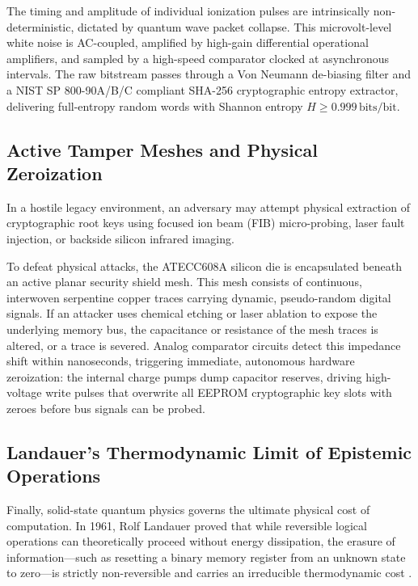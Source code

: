 The timing and amplitude of individual ionization pulses are intrinsically non-deterministic, dictated by quantum wave packet collapse. This microvolt-level white noise is AC-coupled, amplified by high-gain differential operational amplifiers, and sampled by a high-speed comparator clocked at asynchronous intervals. The raw bitstream passes through a Von Neumann de-biasing filter and a NIST SP 800-90A/B/C compliant SHA-256 cryptographic entropy extractor, delivering full-entropy random words with Shannon entropy $H \ge 0.999\,\mathrm{bits/bit}$.

\subsection{Active Tamper Meshes and Physical Zeroization}

In a hostile legacy environment, an adversary may attempt physical extraction of cryptographic root keys using focused ion beam (FIB) micro-probing, laser fault injection, or backside silicon infrared imaging. 

To defeat physical attacks, the ATECC608A silicon die is encapsulated beneath an active planar security shield mesh. This mesh consists of continuous, interwoven serpentine copper traces carrying dynamic, pseudo-random digital signals. If an attacker uses chemical etching or laser ablation to expose the underlying memory bus, the capacitance or resistance of the mesh traces is altered, or a trace is severed. Analog comparator circuits detect this impedance shift within nanoseconds, triggering immediate, autonomous hardware zeroization: the internal charge pumps dump capacitor reserves, driving high-voltage write pulses that overwrite all EEPROM cryptographic key slots with zeroes before bus signals can be probed.

\subsection{Landauer's Thermodynamic Limit of Epistemic Operations}

Finally, solid-state quantum physics governs the ultimate physical cost of computation. In 1961, Rolf Landauer proved that while reversible logical operations can theoretically proceed without energy dissipation, the erasure of information---such as resetting a binary memory register from an unknown state to zero---is strictly non-reversible and carries an irreducible thermodynamic cost \cite{landauer1961irreversibility}.

